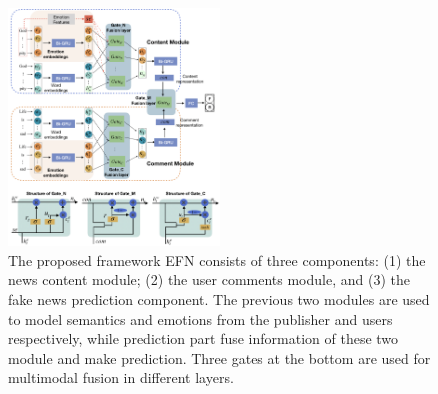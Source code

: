 \documentclass{article}
\newcommand{\m}{EFN}
\begin{document}
	\begin{figure}[t]
		\centering
		\includegraphics[width=0.5\textwidth]{./Figure/framework.png}
		\caption{The proposed framework {\m} consists of three components: (1) the news content module; (2) the user comments module, and (3) the fake news prediction component. The previous two modules are used to model semantics and emotions from the publisher and users respectively, while prediction part fuse information of these two module and make prediction. Three gates at the bottom are used for multimodal fusion in different layers.}
		\label{Fig:framework}
		\vspace{-0.3cm}
	\end{figure}
\end{document}
